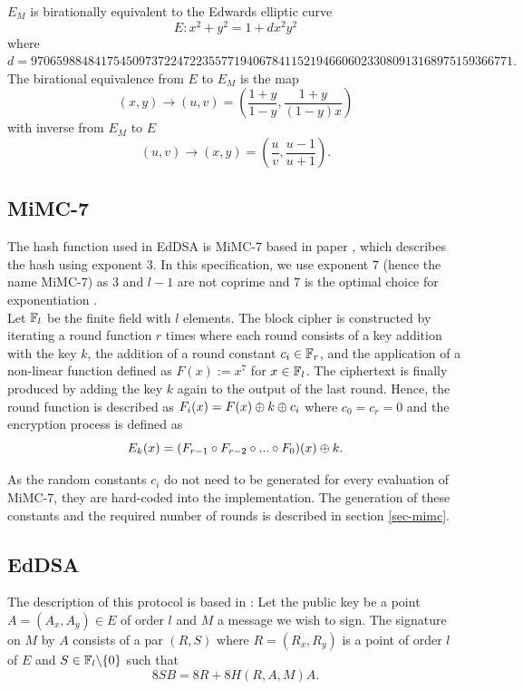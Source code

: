 \documentclass{article}
\begin{document}
\begin{spacing}{1.2}
	$E_M$ is birationally equivalent to the Edwards elliptic curve %
		$$	E: x^2 + y^2 = 1 +  d x^2 y^2 $$
	where
		$ d = 9706598848417545097372247223557719406784115219466060233080913168975159366771.$ \\
	
	The birational equivalence \cite[Thm. 3.2]{twisted} from $E$ to $E_M$ is the map 
		$$ (x,y) \to (u,v) = \left( \frac{1 + y}{1 - y} , \frac{1 + y}{(1 - y)x} \right) $$
	with inverse from $E_M$ to $E$
		$$ (u, v) \to (x, y) = \left(  \frac{u}{v}, \frac{u - 1}{u + 1}   \right). $$
	
	\subsection{MiMC-7}
	
	The hash function used in EdDSA is MiMC-7 based in paper \cite{mimc}, which describes the hash using exponent 3. In this specification, we use exponent 7 (hence the name MiMC-7) as 3 and $l-1$ are not coprime and 7 is the optimal choice for exponentiation \cite[Sec. 6]{mimc}.\\
	
	Let $\mathbb{F}_l$ be the finite field with $l$ elements. The block cipher is constructed by iterating a round function $r$ times where each round consists of a key addition with the key $k$, the addition of a round constant $c_i\in \mathbb{F}_r$, and the application of a non-linear function defined as $F(x) :=x^7$ for $x\in \mathbb{F}_l$. The ciphertext is finally produced by adding the key $k$ again to the output of the last round. Hence, the round function is described as $F_i(x) = F(x) \oplus k \oplus c_i$ where $c_0 = c_r = 0$ and the encryption process is defined as 
		$$ E_k(x) = (F_{r-1} \circ F_{r-2} \circ ... \circ F_0)(x) \oplus k. $$
		
	
	
	As the random  constants $c_i$ do  not  need  to  be  generated  for  every evaluation of MiMC-7, they are hard-coded into the implementation. The generation of these constants and the required number of rounds is described in section \ref{sec-mimc}. 
	
	\subsection{EdDSA}
		
	The description of this protocol is based in \cite{eddsa}:  	
	Let the public key be a point $A = (A_x, A_y)\in E$ of order $l$ and $M$ a message we wish to sign. The signature on $M$ by $A$ consists of a par $(R,S)$ where $R = (R_x, R_y)$ is a point of order $l$ of $E$ and $S\in\mathbb{F}_l\backslash\{0\}$ such that 
	$$ 8SB = 8R + 8H(R,A,M)A.	$$
	

\end{spacing}
\end{document}
